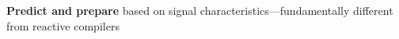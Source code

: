 \documentclass[aspectratio=169,11pt]{beamer}
\begin{document}
\begin{frame}{}

\vspace{1.5cm}

\begin{tcolorbox}[colback=purple!10,colframe=purple!70,title=\textbf{The Big Idea}]
{\Large
\textbf{Predict and prepare} based on signal characteristics—fundamentally different from reactive compilers
}
\end{tcolorbox}

\end{frame}

\end{document}
